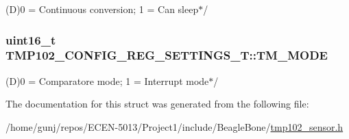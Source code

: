 \begin{DoxyItemize}
\item (D)0 = Continuous conversion; 1 = Can sleep$\ast$/ 
\end{DoxyItemize}
\subsubsection[{\texorpdfstring{T\+M\+\_\+\+M\+O\+DE}{TM_MODE}}]{\setlength{\rightskip}{0pt plus 5cm}uint16\+\_\+t T\+M\+P102\+\_\+\+C\+O\+N\+F\+I\+G\+\_\+\+R\+E\+G\+\_\+\+S\+E\+T\+T\+I\+N\+G\+S\+\_\+\+T\+::\+T\+M\+\_\+\+M\+O\+DE}\hypertarget{structTMP102__CONFIG__REG__SETTINGS__T_a635d77b82a949a2299e1981d7ace305d}{}\label{structTMP102__CONFIG__REG__SETTINGS__T_a635d77b82a949a2299e1981d7ace305d}

\begin{DoxyItemize}
\item (D)0 = Comparatore mode; 1 = Interrupt mode$\ast$/ 
\end{DoxyItemize}

The documentation for this struct was generated from the following file\+:\begin{DoxyCompactItemize}
\item 
/home/gunj/repos/\+E\+C\+E\+N-\/5013/\+Project1/include/\+Beagle\+Bone/\hyperlink{tmp102__sensor_8h}{tmp102\+\_\+sensor.\+h}\end{DoxyCompactItemize}
